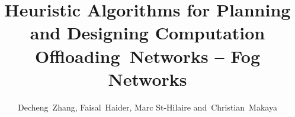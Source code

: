 \documentclass[10pt,journal,compsoc]{IEEEtran}
\begin{document}
%
\title{Heuristic Algorithms for Planning and Designing Computation Offloading~Networks -- Fog Networks}
%
%
%
%

\author{Decheng~Zhang, %
        Faisal~Haider, %
        Marc St-Hilaire %
        and~Christian~Makaya%

}

% 
%
\end{document}
